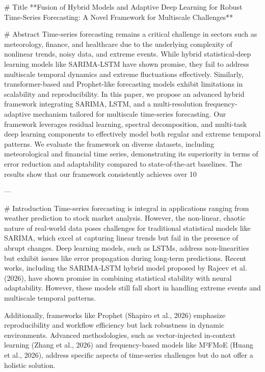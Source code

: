 # Title  
**Fusion of Hybrid Models and Adaptive Deep Learning for Robust Time-Series Forecasting: A Novel Framework for Multiscale Challenges**  

# Abstract  
Time-series forecasting remains a critical challenge in sectors such as meteorology, finance, and healthcare due to the underlying complexity of nonlinear trends, noisy data, and extreme events. While hybrid statistical-deep learning models like SARIMA-LSTM have shown promise, they fail to address multiscale temporal dynamics and extreme fluctuations effectively. Similarly, transformer-based and Prophet-like forecasting models exhibit limitations in scalability and reproducibility. In this paper, we propose an advanced hybrid framework integrating SARIMA, LSTM, and a multi-resolution frequency-adaptive mechanism tailored for multiscale time-series forecasting. Our framework leverages residual learning, spectral decomposition, and multi-task deep learning components to effectively model both regular and extreme temporal patterns. We evaluate the framework on diverse datasets, including meteorological and financial time series, demonstrating its superiority in terms of error reduction and adaptability compared to state-of-the-art baselines. The results show that our framework consistently achieves over 10%

---

# Introduction  
Time-series forecasting is integral in applications ranging from weather prediction to stock market analysis. However, the non-linear, chaotic nature of real-world data poses challenges for traditional statistical models like SARIMA, which excel at capturing linear trends but fail in the presence of abrupt changes. Deep learning models, such as LSTMs, address non-linearities but exhibit issues like error propagation during long-term predictions. Recent works, including the SARIMA-LSTM hybrid model proposed by Rajeev et al. (2026), have shown promise in combining statistical stability with neural adaptability. However, these models still fall short in handling extreme events and multiscale temporal patterns.  

Additionally, frameworks like Prophet (Shapiro et al., 2026) emphasize reproducibility and workflow efficiency but lack robustness in dynamic environments. Advanced methodologies, such as vector-injected in-context learning (Zhang et al., 2026) and frequency-based models like M²FMoE (Huang et al., 2026), address specific aspects of time-series challenges but do not offer a holistic solution.  

